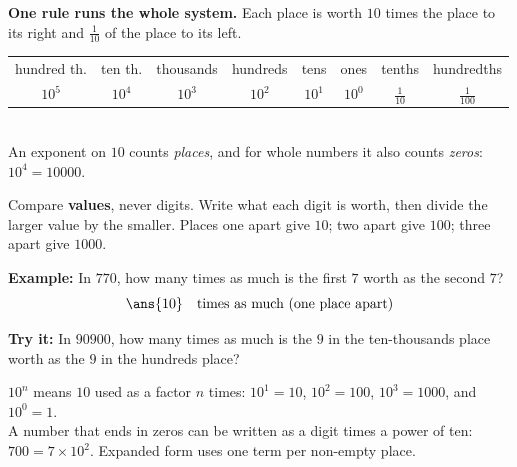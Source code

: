 \documentclass[12pt]{article}
\begin{document}

\begin{formulabox}
\textbf{One rule runs the whole system.} Each place is worth $10$ times the
place to its right and $\tfrac{1}{10}$ of the place to its left.\\[2pt]
\begin{tabular}{@{}cccccccc@{}}
hundred th. & ten th. & thousands & hundreds & tens & ones & tenths & hundredths \\
$10^5$ & $10^4$ & $10^3$ & $10^2$ & $10^1$ & $10^0$ & $\frac{1}{10}$ & $\frac{1}{100}$ \\
\end{tabular}\\[2pt]
An exponent on $10$ counts \emph{places}, and for whole numbers it also counts
\emph{zeros}: $10^4 = 10000$.
\end{formulabox}


\begin{formulabox}
Compare \textbf{values}, never digits. Write what each digit is worth, then
divide the larger value by the smaller. Places one apart give $10$; two apart
give $100$; three apart give $1000$.
\end{formulabox}

\begin{examplebox}
\textbf{Example:} In $770$, how many times as much is the first $7$ worth as the
second $7$?
\[ \ans{10} \quad\text{times as much (one place apart)} \]
\end{examplebox}

\begin{tryitbox}
\textbf{Try it:} In $90900$, how many times as much is the $9$ in the
ten-thousands place worth as the $9$ in the hundreds place?\\[2pt]
\end{tryitbox}


\begin{formulabox}
$10^n$ means $10$ used as a factor $n$ times:
$10^1 = 10$, $10^2 = 100$, $10^3 = 1000$, and $10^0 = 1$.\\[2pt]
A number that ends in zeros can be written as a digit times a power of ten:
$700 = 7 \times 10^2$. Expanded form uses one term per non-empty place.
\end{formulabox}
\end{document}
